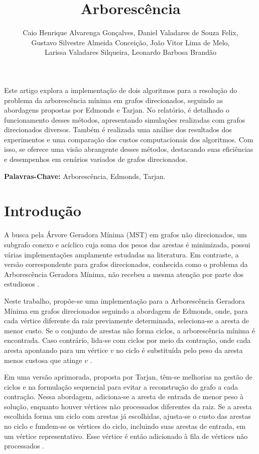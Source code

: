 \documentclass[12pt]{article}
\title{Arborescência}
\author{Caio Henrique Alvarenga Gonçalves\inst{1}, Daniel Valadares de Souza Felix\inst{1}, \\ Gustavo Silvestre Almeida Conceição\inst{1}, João Vitor Lima de Melo\inst{1}, \\ Larissa Valadares Silqueira\inst{1}, Leonardo Barbosa Brandão\inst{1} }
\begin{document}
 

\maketitle
     
\begin{resumo} 
  Este artigo explora a implementação de dois algoritmos para a resolução do problema da arborescência mínima em grafos direcionados, seguindo as abordagens propostas por Edmonds e Tarjan. No relatório, é detalhado o funcionamento desses métodos, apresentando simulações realizadas com grafos direcionados diversos. Também é realizada uma análise dos resultados dos experimentos e uma comparação dos custos computacionais dos algoritmos. Com isso, se oferece uma visão abrangente desses métodos, destacando suas eficiências e desempenhos em cenários variados de grafos direcionados.

  \textbf{Palavras-Chave:} Arborescência, Edmonds, Tarjan.
\end{resumo}


\section{Introdução}

A busca pela Árvore Geradora Mínima (MST) em grafos não direcionados, um subgrafo conexo e acíclico cuja soma dos pesos das arestas é minimizada, possui várias implementações amplamente estudadas na literatura. Em contraste, a versão correspondente para grafos direcionados, conhecida como o problema da Arborescência Geradora Mínima, não recebeu a mesma atenção por parte dos estudiosos \cite{kruskal1956shortest} \cite{prim/6773228}.

Neste trabalho, propõe-se uma implementação para a Arborescência Geradora Mínima em grafos direcionados seguindo a abordagem de Edmonds, onde, para cada vértice diferente da raiz previamente determinada, seleciona-se a aresta de menor custo. Se o conjunto de arestas não forma ciclos, a arborescência mínima é encontrada. Caso contrário, lida-se com ciclos por meio da contração, onde cada aresta apontando para um vértice \(v\) no ciclo é substituída pelo peso da aresta menos custosa que atinge \(v\) \cite{Edmonds1967}.

Em uma versão aprimorada, proposta por Tarjan, têm-se melhorias na gestão de ciclos e na formulação sequencial para evitar a reconstrução do grafo a cada contração. Nessa abordagem, adiciona-se a aresta de entrada de menor peso à solução, enquanto houver vértices não processados diferentes da raiz. Se a aresta escolhida forma um ciclo com arestas já escolhidas, ajusta-se o custo das arestas no ciclo e fundem-se os vértices do ciclo, incluindo suas arestas de entrada, em um vértice representativo. Esse vértice é então adicionado à fila de vértices não processados \cite{Tarjan1977FindingOB}.
\end{document}
